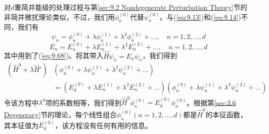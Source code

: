     对$d$重简并能级的处理过程与第\ref{sec:9.2 Nondegenerate Perturbation Theory}节的非简并微扰理论类似，不过，我们用$\phi_n^{\left(0\right)}$代替$\psi_n^{\left(0\right)}$。与(\ref{eq:9.13})和(\ref{eq:9.14})不同，我们有
    \begin{equation}
            \psi_n = \phi_n^{\left(0\right)} + \lambda\phi_n^{\left(1\right)} + \lambda^2\phi_n^{\left(2\right)} + \ldots, \quad n = 1,2,\ldots,d
            \label{eq:9.74}
    \end{equation}
    \begin{equation}
            E_n = E_n^{\left(0\right)} + \lambda E_n^{\left(1\right)} + \lambda^2 E_n^{\left(2\right)} + \ldots, \quad n = 1,2,\ldots,d
            \label{eq:9.75}
    \end{equation}
    其中用到了(\ref{eq:9.68})。将其带入$\hat{H}\psi_n = E_n\psi_n$，我们得到
    \begin{equation*}
        \begin{aligned}
            \left(\hat{H}^0 + \lambda\hat{H}'\right)&\left(\phi_n^{\left(0\right)} + \lambda\psi_n^{\left(1\right)} + \lambda^2\psi_n^{\left(2\right)} + \ldots\right) \\
            &= \left(E_d^{\left(0\right)} + \lambda E_n^{\left(1\right)} + \lambda^2 E_n^{\left(2\right)} + \ldots\right)\left(\phi_n^{\left(0\right)} + \lambda\psi_n^{\left(1\right)} + \lambda^2\psi_n^{\left(2\right)} + \ldots\right)
        \end{aligned}
    \end{equation*}
    令该方程中$\lambda^0$项的系数相等，我们得到$\hat{H}^0\phi_n^{\left(0\right)} = E_d^{\left(0\right)}\phi_n^{\left(0\right)}$。根据第\ref{sec:3.6 Degeneracy}节的理论，每个线性组合$\phi_n^{\left(0\right)}\left(n = 1,2,\ldots,d\right)$都是$\hat{H}^0$的本征函数，其本征值为$E_d^{\left(0\right)}$，该方程没有任何有用的信息。

